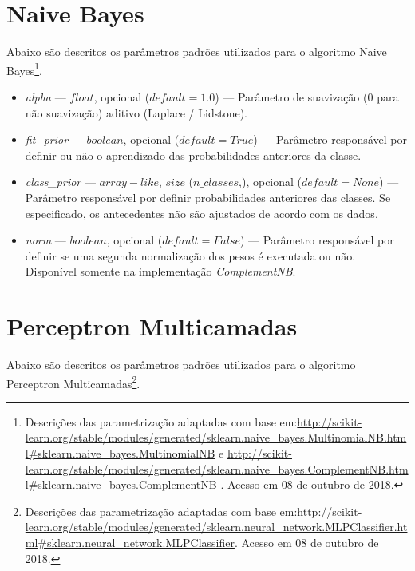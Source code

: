 \documentclass[
	12pt,				%
	oneside,			%
	a4paper,			%
	english,			%
	brazil				%
	]{abntex2ppgsi}
\begin{document}
{{{\begin{apendicesenv}
\begin{itemize}
\end{itemize}

\section{Naive Bayes}

Abaixo são descritos os parâmetros padrões utilizados para o algoritmo Naive Bayes\footnote{Descrições das parametrização adaptadas com base em:\url{http://scikit-learn.org/stable/modules/generated/sklearn.naive_bayes.MultinomialNB.html\#sklearn.naive_bayes.MultinomialNB} e \url{http://scikit-learn.org/stable/modules/generated/sklearn.naive_bayes.ComplementNB.html\#sklearn.naive_bayes.ComplementNB} . Acesso em 08 de outubro de 2018.}.

\begin{itemize}
\item \textit{alpha} --- $float$, opcional ($default=1.0$) --- Parâmetro de suavização (0 para não suavização) aditivo (Laplace / Lidstone).
\item \textit{fit\_prior} --- $boolean$, opcional ($default=True$) --- Parâmetro responsável por definir ou não o aprendizado das probabilidades anteriores da classe.
\item \textit{class\_prior} --- $array-like$, $size$ ($n\_classes$,), opcional ($default=None$) --- Parâmetro responsável por definir probabilidades anteriores das classes. Se especificado, os antecedentes não são ajustados de acordo com os dados.
\item \textit{norm} --- $boolean$, opcional ($default=False$) ---
Parâmetro responsável por definir se uma segunda normalização dos pesos é executada ou não. Disponível somente na implementação \textit{ComplementNB}.
\end{itemize}

\section{Perceptron Multicamadas}

Abaixo são descritos os parâmetros padrões utilizados para o algoritmo Perceptron Multicamadas\footnote{Descrições das parametrização adaptadas com base em:\url{http://scikit-learn.org/stable/modules/generated/sklearn.neural_network.MLPClassifier.html\#sklearn.neural_network.MLPClassifier}. Acesso em 08 de outubro de 2018.}.


\end{apendicesenv}}}}
\end{document}
